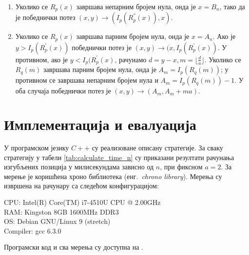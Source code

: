 \documentclass[a4paper]{article}
\begin{document}
\begin{enumerate}
	\item \label{item:neparne_nule} Уколико се $ R_{p}(x) $ завршава непарним бројем нула, онда је $ x = B_{n} $, тако да је победнички потез $ (x, y) \rightarrow (I_{p}(R^{''}_{p}(x)), x) $.
	\item \label{item:parne_nule} Уколико се $ R_{p}(x) $ завршава парним бројем нула, онда је $ x = A_{n} $. Ако је $ y > I_{p}(R^{'}_{p}(x)) $ победнички потез је $ (x, y) \rightarrow (x, I_{p}(R^{'}_{p}(x)) $. У противном, ако је $ y < I_{p}(R^{'}_{p}(x) $, рачунамо $ d = y - x, m = \lfloor \frac{d}{a} \rfloor $. Уколико се $ R_{q}(m) $ завршава парним бројем нула, онда је $ A_{m} = I_{p}(R_{q}(m)) $; у противном се завршава непарним бројем нула и $ A_{m} = I_{p}(R_{q}(m)) - 1 $. У оба случаја победнички потез је $ (x, y) \rightarrow (A_{m}, A_{m} + ma) $.
\end{enumerate}

\section{Имплементација и евалуација}
\label{sec:implementacija_evaluacija}

У програмском језику $ C++ $ су реализоване описану стратегије. За сваку стратегију у табели \ref{tab:calculate_time_n} су приказани резултати рачунања изгубљених позиција у милисекундама зависно од $ n $, при фиксном $ a = 2 $. 
За мерење је коришћена хроно библиотека (енг.{~\em chrono library}). Мерења су извршена на рачунару са следећом конфигурацијом:
\begin{flushleft}
	CPU: Intel(R) Core(TM) i7-4510U CPU @ 2.00GHz\\
	RAM: Kingston 8GB 1600MHz DDR3\\
	OS: Debian GNU/Linux 9 (stretch)\\
	Compiler: gcc 6.3.0\\
\end{flushleft}

Програмски код и сва мерења су доступна на \cite{marija_mijailovic_2020_4033166}.

\end{document}
